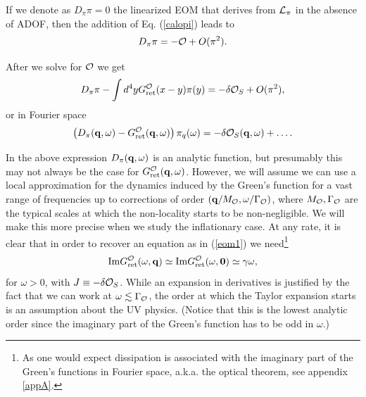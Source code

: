 \documentclass[11pt,amsmath,floats,floatfix,nofootinbib,secnumarabic, superscriptaddress, tightenlines]{revtex4}
\newcommand{\beq}{\begin{equation}}
\newcommand{\eeq}{\end{equation}}
\newcommand{\calo}{{\cal O}}
\begin{document}
If we denote as $D_\pi \pi=0$ the linearized EOM that derives from $\cal L_\pi$ in the absence of ADOF, then the addition of Eq. (\ref{calopi}) leads to
\beq
D_\pi \pi =- \calo  + O(\pi^2).
\eeq

After we solve for $\calo$ we get
\beq
\label{dpig}
D_\pi \pi -  \int d^4y G_{\rm ret}^\calo(x-y)\pi(y) = -\delta\calo_S + O(\pi^2),
\eeq
or in Fourier space
\beq
\left(D_\pi({\bf q},\omega)- G_{\rm ret}^\calo({\bf q},\omega)\right) \pi_q(\omega) =-\delta\calo_S({\bf q},\omega) + \ldots.
\eeq

In the above expression $D_\pi({\bf q},\omega)$ is an analytic function, but presumably this may not always be the case for $G_{\rm ret}^\calo({\bf q},\omega)$. However, we will assume we can use a local approximation for the dynamics induced by the Green's function for a vast range of frequencies up to corrections of order $({\bf q}/M_\calo, \omega/\Gamma_\calo)$, where $M_\calo,\Gamma_\calo$ are the typical scales at which the non-locality starts to be non-negligible. We will make this more precise when we study the inflationary case. At any rate, it is clear that in order to recover an equation as in (\ref{eom1}) we need\footnote{As one would expect dissipation is associated with the imaginary part of the Green's functions in Fourier space, a.k.a. the optical theorem, see appendix \ref{appA}.}
\beq
\label{expG}
{\rm Im} G_{\rm ret}^\calo (\omega,{\bf q}) \simeq {\rm Im} G_{\rm ret}^\calo (\omega,{\bf 0}) \simeq  \gamma \omega,
\eeq
for $\omega>0$, with $J \equiv -\delta\calo_S$.  While an expansion in derivatives is justified by the fact that we can work at $\omega\lesssim \Gamma_{\cal O}$, the order at which the Taylor expansion starts is an assumption about the UV physics. (Notice that this is the lowest analytic order since the imaginary part of the Green's function has to be odd in $\omega$.)
\end{document}
